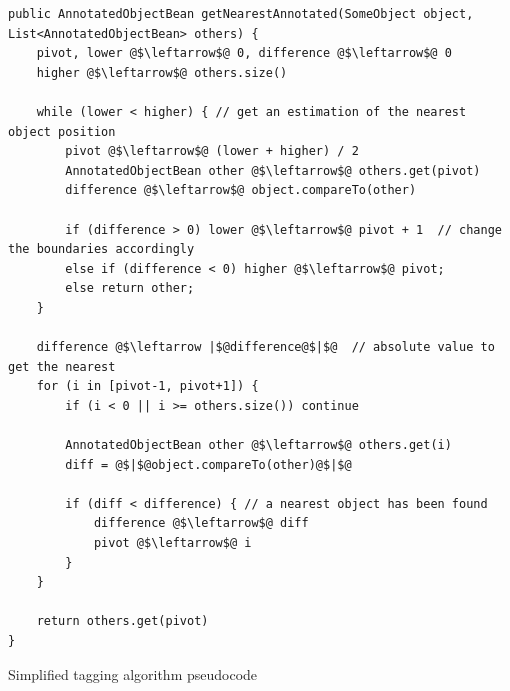 \begin{listing}[H]
	\begin{verbatim}
public AnnotatedObjectBean getNearestAnnotated(SomeObject object, List<AnnotatedObjectBean> others) {
	pivot, lower @$\leftarrow$@ 0, difference @$\leftarrow$@ 0
	higher @$\leftarrow$@ others.size()
	
	while (lower < higher) { // get an estimation of the nearest object position 
		pivot @$\leftarrow$@ (lower + higher) / 2
		AnnotatedObjectBean other @$\leftarrow$@ others.get(pivot)
		difference @$\leftarrow$@ object.compareTo(other)
		
		if (difference > 0) lower @$\leftarrow$@ pivot + 1  // change the boundaries accordingly 
		else if (difference < 0) higher @$\leftarrow$@ pivot;
		else return other;
	}
	
	difference @$\leftarrow |$@difference@$|$@  // absolute value to get the nearest
	for (i in [pivot-1, pivot+1]) {
		if (i < 0 || i >= others.size()) continue
		
		AnnotatedObjectBean other @$\leftarrow$@ others.get(i)
		diff = @$|$@object.compareTo(other)@$|$@
		
		if (diff < difference) { // a nearest object has been found
			difference @$\leftarrow$@ diff
			pivot @$\leftarrow$@ i
		}
	}
	
	return others.get(pivot)	
}
	\end{verbatim}
	\caption{Simplified tagging algorithm pseudocode}
	\label{lst:simplified tagging algorithm}
\end{listing}


